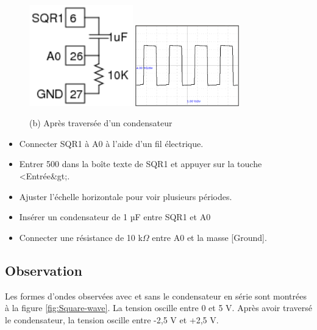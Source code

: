 \documentclass{book}
\begin{document}
\begin{figure}[h!]
\begin{center}
\caption{\label{}(b) Après traversée d'un condensateur }\vspace{0.5em}
\includegraphics[width=0.4\textwidth, height=0.3\textwidth, keepaspectratio]{Schematic-ac-dc.png}
\includegraphics[width=0.4\textwidth, height=0.3\textwidth, keepaspectratio]{Pic-sqrwave-dcblocked.png}
\end{center}
\end{figure}



\begin{itemize}
  \item Connecter SQR1 à A0 à l'aide d'un fil électrique.
  \item Entrer 500 dans la boîte texte de SQR1 et appuyer sur la touche <Entrée\&gt;.
  \item Ajuster l'échelle horizontale pour voir plusieurs périodes.
  \item Insérer un condensateur de 1 µF entre SQR1 et A0
  \item Connecter une résistance de 10 k$\Omega$  entre A0 et la masse [Ground].
\end{itemize}

\subsection{Observation}


Les formes d'ondes observées avec et sans le condensateur en série sont montrées à la figure  \ref{fig:Square-wave}. La tension oscille entre 0 et 5 V. Après avoir traversé le condensateur, la tension oscille entre -2,5 V et +2,5 V.
\end{document}
